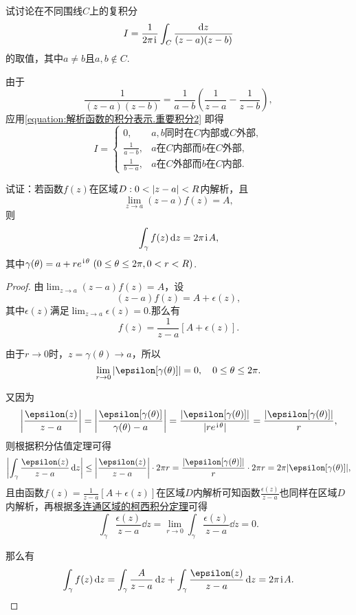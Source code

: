 \begin{example}
试讨论在不同围线\(C\)上的复积分\[
I = \frac{1}{2\pi\kern1pt\mathrm{i}\kern1pt} \int_C \frac{\dd{z}}{(z-a)(z-b)}
\]的取值，其中\(a \neq b\)且\(a,b \notin C\).
\begin{solution}
由于\[
	\frac{1}{(z-a)(z-b)}
	= \frac{1}{a-b} \left(\frac{1}{z-a}-\frac{1}{z-b}\right),
\]
应用\cref{equation:解析函数的积分表示.重要积分2}
即得\[
	I = \left\{\begin{array}{cl}
		0, & \text{\(a,b\)同时在\(C\)内部或\(C\)外部}, \\
		\frac{1}{a-b}, & \text{\(a\)在\(C\)内部而\(b\)在\(C\)外部}, \\
		\frac{1}{b-a}, & \text{\(a\)在\(C\)外部而\(b\)在\(C\)内部}.
	\end{array}\right.
\]
\end{solution}
\end{example}

\begin{example}%
试证：若函数\(f(z)\)在区域\(D: 0<\abs{z-a}<R\)内解析，且\[
\lim_{z \to a}(z-a)f(z)=A,
\]则\[
\int_{\gamma} f(z) \dd{z} = 2\pi\kern1pt\mathrm{i}\kern1pt A,
\]其中\(\gamma(\theta) = a+re^{\kern1pt\mathrm{i}\kern1pt\theta}\ (0 \leq \theta \leq 2\pi, 0 < r < R)\).
\begin{proof}
由\(\lim_{z \to a}(z-a)f(z) = A\)，设\[
(z-a)f(z) = A + \epsilon(z),
\]其中\(\epsilon(z)\)满足\(\lim_{z \to a} \epsilon(z) = 0\).那么有\[
f(z) = \frac{1}{z-a}[A+\epsilon(z)].
\]

由于\(r\to0\)时，\(z=\gamma(\theta) \to a\)，所以\[
\lim_{r\to0} \abs{\epsilon[\gamma(\theta)]} = 0,
\quad 0 \leq \theta \leq 2\pi.
\]

又因为\[
\abs{\frac{\epsilon(z)}{z-a}}
= \abs{\frac{\epsilon[\gamma(\theta)]}{\gamma(\theta)-a}}
= \frac{\abs{\epsilon[\gamma(\theta)]}}{\abs{re^{\iu\theta}}}
= \frac{\abs{\epsilon[\gamma(\theta)]}}{r},
\]则根据积分估值定理可得\[
\abs{\int_{\gamma} \frac{\epsilon(z)}{z-a} \dd{z}}
\leq \abs{\frac{\epsilon(z)}{z-a}} \cdot 2\pi r
= \frac{\abs{\epsilon[\gamma(\theta)]}}{r} \cdot 2\pi r
= 2\pi \abs{\epsilon[\gamma(\theta)]},
\]且由函数\(f(z) = \frac{1}{z-a}[A+\epsilon(z)]\)在区域\(D\)内解析可知函数\(\frac{\epsilon(z)}{z-a}\)也同样在区域\(D\)内解析，再根据\hyperref[theorem:解析函数的积分表示.多连通区域的柯西积分定理]{多连通区域的柯西积分定理}可得\[
\int_{\gamma} \frac{\epsilon(z)}{z-a} \dd{z}
= \lim_{r\to0} \int_{\gamma} \frac{\epsilon(z)}{z-a} \dd{z}
= 0.
\]

那么有
\[
\int_{\gamma} f(z) \dd{z}
= \int_{\gamma} \frac{A}{z-a} \dd{z}
+ \int_{\gamma} \frac{\epsilon(z)}{z-a} \dd{z}
= 2\pi\iu A.
\qedhere
\]
\end{proof}
\end{example}

